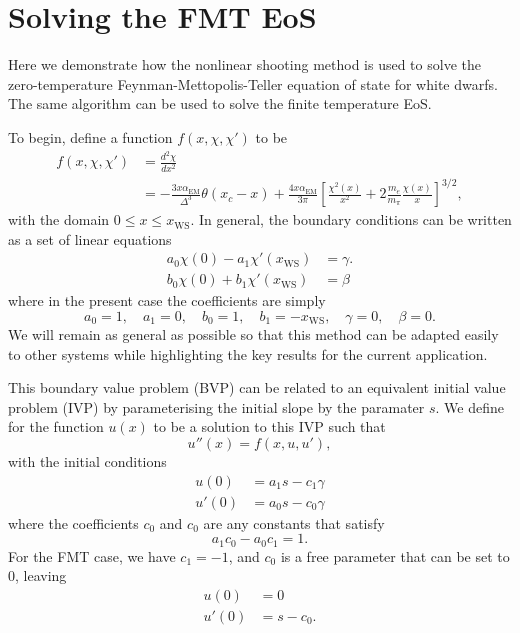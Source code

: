\chapter{Solving the FMT EoS}
\label{appendix:FMT_solution}

Here we demonstrate how the nonlinear shooting method is used to solve the zero-temperature Feynman-Mettopolis-Teller equation of state for white dwarfs. The same algorithm can be used to solve the finite temperature EoS. 

To begin, define a function $f(x, \chi, \chi')$ to be
\begin{align}
    f(x, \chi, \chi') & = \frac{d^2\chi}{dx^2}\\
    & =  -\frac{3 x \alpha_\mathrm{EM}}{\Delta^3}\theta(x_c -x) + \frac{4 x\alpha_\mathrm{EM}}{3\pi}\left[ \frac{\chi^2(x)}{x^2} + 2\frac{m_e}{m_\pi}\frac{\chi(x)}{x}\right]^{3/2},
 \end{align}   
with the domain $0 \leq x \leq x_\mathrm{WS}$.
In general, the boundary conditions can be written as a set of linear equations
\begin{align}
    a_0 \chi(0) - a_1 \chi'(x_\mathrm{WS}) &= \gamma. \\ 
    b_0 \chi(0) + b_1 \chi'(x_\mathrm{WS}) & = \beta
\end{align}
where in the present case the coefficients are simply
\begin{equation}
    a_0 = 1,\quad a_1 = 0,\quad b_0 = 1,\quad b_1 = -x_\mathrm{WS}, \quad \gamma =0,\quad \beta = 0.
\end{equation}
We will remain as general as possible so that this method can be adapted easily to other systems while highlighting the key results for the current application.

This boundary value problem (BVP) can be related to an equivalent initial value problem (IVP) by parameterising the initial slope by the paramater $s$.  We define for the function $u(x)$ to be a solution to this IVP such that
\begin{equation}
    u''(x) = f(x, u, u'),
\end{equation}
with the initial conditions
\begin{align}
    u(0) & = a_1 s - c_1 \gamma \\
    u'(0) & = a_0 s - c_0 \gamma 
\end{align}
where the coefficients $c_0$ and $c_0$ are any constants that satisfy 
\begin{equation}
    a_1 c_0 - a_0 c_1 = 1.
\end{equation}
For the FMT case, we have $c_1 = -1$, and $c_0$ is a free parameter that can be set to 0, leaving
\begin{align}
     u(0) & = 0\\
     u'(0) & = s - c_0.
\end{align}

